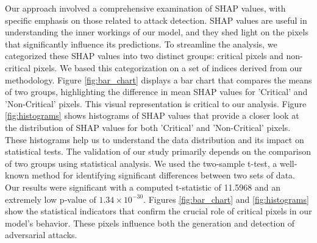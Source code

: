 \documentclass[10pt, conference, a4paper, final]{IEEEtran}
\begin{document}
    Our approach involved a comprehensive examination of SHAP values, with specific emphasis on those related to attack detection. SHAP values are useful in understanding the inner workings of our model, and they shed light on the pixels that significantly influence its predictions. To streamline the analysis, we categorized these SHAP values into two distinct groups: critical pixels and non-critical pixels. We based this categorization on a set of indices derived from our methodology.
    Figure \ref{fig:bar_chart} displays a bar chart that compares the means of two groups, highlighting the difference in mean SHAP values for 'Critical' and 'Non-Critical' pixels. This visual representation is critical to our analysis.   
    Figure \ref{fig:histograms} shows histograms of SHAP values that provide a closer look at the distribution of SHAP values for both 'Critical' and 'Non-Critical' pixels. These histograms help us to understand the data distribution and its impact on statistical tests.    
    The validation of our study primarily depends on the comparison of two groups using statistical analysis. We used the two-sample t-test, a well-known method for identifying significant differences between two sets of data. Our results were significant with a computed t-statistic of 11.5968 and an extremely low p-value of $1.34 \times 10^{-30}$. Figures \ref{fig:bar_chart} and \ref{fig:histograms} show the statistical indicators that confirm the crucial role of critical pixels in our model's behavior. These pixels influence both the generation and detection of adversarial attacks.
    
\end{document}
